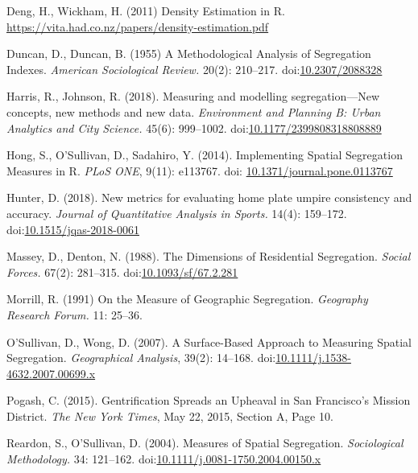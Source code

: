 \documentclass{article}
\theoremstyle{theorem}
\theoremstyle{definition}
\begin{document}
\begin{thebibliography}{3}

 Deng, H., Wickham, H. (2011) Density Estimation in R. \href{https://vita.had.co.nz/papers/density-estimation.pdf}{\url{https://vita.had.co.nz/papers/density-estimation.pdf}}

 Duncan, D., Duncan, B. (1955) A Methodological Analysis of Segregation Indexes. \textit{American Sociological Review.} 20(2): 210--217. doi:\href{http://dx.doi.org/10.2307/2088328}{10.2307/2088328}

Harris, R., Johnson, R. (2018). Measuring and modelling segregation---New concepts, new methods and new data. \textit{Environment and Planning B: Urban Analytics and City Science.} 45(6): 999--1002. doi:\href{http://dx.doi.org/10.1177/2399808318808889}{10.1177/2399808318808889}

 Hong, S., O'Sullivan, D., Sadahiro, Y. (2014). Implementing Spatial Segregation Measures in R. \textit{PLoS ONE}, 9(11): e113767. doi: \href{http://dx.doi.org/10.1371/journal.pone.0113767}{10.1371/journal.pone.0113767}

 Hunter, D. (2018). New metrics for evaluating home plate umpire consistency and accuracy. \textit{Journal of Quantitative Analysis in Sports.} 14(4): 159--172. doi:\href{http://dx.doi.org/10.1515/jqas-2018-0061}{10.1515/jqas-2018-0061}

 Massey, D., Denton, N. (1988). The Dimensions of Residential Segregation. \textit{Social Forces.} 67(2): 281--315. doi:\href{http://dx.doi.org/10.1093/sf/67.2.281}{10.1093/sf/67.2.281}

 Morrill, R. (1991) On the Measure of Geographic Segregation. \textit{Geography Research Forum.} 11: 25--36.

 O'Sullivan, D., Wong, D. (2007). A Surface-Based Approach to Measuring Spatial Segregation. \textit{Geographical Analysis}, 39(2): 14--168. doi:\href{http://dx.doi.org/10.1111/j.1538-4632.2007.00699.x}{10.1111/j.1538-4632.2007.00699.x}

Pogash, C. (2015). Gentrification Spreads an Upheaval in San Francisco's Mission District. \textit{The New York Times}, May 22, 2015, Section A, Page 10.

Reardon, S., O'Sullivan, D. (2004). Measures of Spatial Segregation. \textit{Sociological Methodology.} 34: 121--162. doi:\href{http://dx.doi.org/10.1111/j.0081-1750.2004.00150.x}{10.1111/j.0081-1750.2004.00150.x}


\end{thebibliography}
\end{document}
